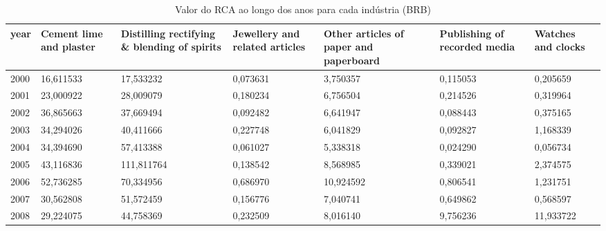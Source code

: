 \begin{table}
\centering
\caption{Valor do RCA ao longo dos anos para cada indústria (BRB)}
\begin{tabular}{p{1cm}p{2cm}p{2cm}p{2cm}p{2cm}p{2cm}p{2cm}}
\toprule
 year &  Cement lime and plaster &  Distilling rectifying \& blending of spirits &  Jewellery and related articles &  Other articles of paper and paperboard &  Publishing of recorded media &  Watches and clocks \\
\midrule
 2000 &                16,611533 &                                    17,533232 &                        0,073631 &                                3,750357 &                      0,115053 &            0,205659 \\
 2001 &                23,000922 &                                    28,009079 &                        0,180234 &                                6,756504 &                      0,214526 &            0,319964 \\
 2002 &                36,865663 &                                    37,669494 &                        0,092482 &                                6,641947 &                      0,088443 &            0,375165 \\
 2003 &                34,294026 &                                    40,411666 &                        0,227748 &                                6,041829 &                      0,092827 &            1,168339 \\
 2004 &                34,394690 &                                    57,413388 &                        0,061027 &                                5,338318 &                      0,024290 &            0,056734 \\
 2005 &                43,116836 &                                   111,811764 &                        0,138542 &                                8,568985 &                      0,339021 &            2,374575 \\
 2006 &                52,736285 &                                    70,334956 &                        0,686970 &                               10,924592 &                      0,806541 &            1,231751 \\
 2007 &                30,562808 &                                    51,572459 &                        0,156776 &                                7,040741 &                      0,649862 &            0,568597 \\
 2008 &                29,224075 &                                    44,758369 &                        0,232509 &                                8,016140 &                      9,756236 &           11,933722 \\

\end{tabular}
\end{table}

